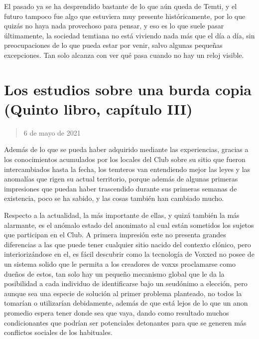 \documentclass[
  spanish,
]{book}
\begin{document}
El pasado ya se ha desprendido bastante de lo que aún queda de Temti, y el futuro tampoco fue algo que estuviera muy presente históricamente, por lo que quizás no haya nada provechoso para pensar, y eso es lo que suele pasar últimamente, la sociedad temtiana no está viviendo nada más que el día a día, sin preocupaciones de lo que pueda estar por venir, salvo algunas pequeñas excepciones. Tan solo alcanza con ver qué pasa cuando no hay un reloj visible.

\hypertarget{los-estudios-sobre-una-burda-copia-quinto-libro-capuxedtulo-iii}{%
\section{Los estudios sobre una burda copia (Quinto libro, capítulo III)}\label{los-estudios-sobre-una-burda-copia-quinto-libro-capuxedtulo-iii}}

\begin{quote}
6 de mayo de 2021
\end{quote}

Además de lo que se pueda haber adquirido mediante las experiencias, gracias a los conocimientos acumulados por los locales del Club sobre su sitio que fueron intercambiados hasta la fecha, los temteros van entendiendo mejor las leyes y las anomalías que rigen su actual territorio, porque además de algunas primeras impresiones que puedan haber trascendido durante sus primeras semanas de existencia, poco se ha sabido, y las cosas también han cambiado mucho.

Respecto a la actualidad, la más importante de ellas, y quizá también la más alarmante, es el anómalo estado del anonimato al cual están sometidos los sujetos que participan en el Club. A primera impresión este no presenta grandes diferencias a las que puede tener cualquier sitio nacido del contexto clónico, pero interiorizándose en el, es fácil descubrir como la tecnología de Voxxed no posee de un sistema solido que le permita a los creadores de voxxs proclamarse como dueños de estos, tan solo hay un pequeño mecanismo global que le da la posibilidad a cada individuo de identificarse bajo un seudónimo a elección, pero aunque sea una especie de solución al primer problema planteado, no todos la tomarían o utilizarían debidamente, además de que está lejos de lo que un anon promedio espera tener donde sea que vaya, dando como resultado muchos condicionantes que podrían ser potenciales detonantes para que se generen más conflictos sociales de los habituales.
\end{document}
